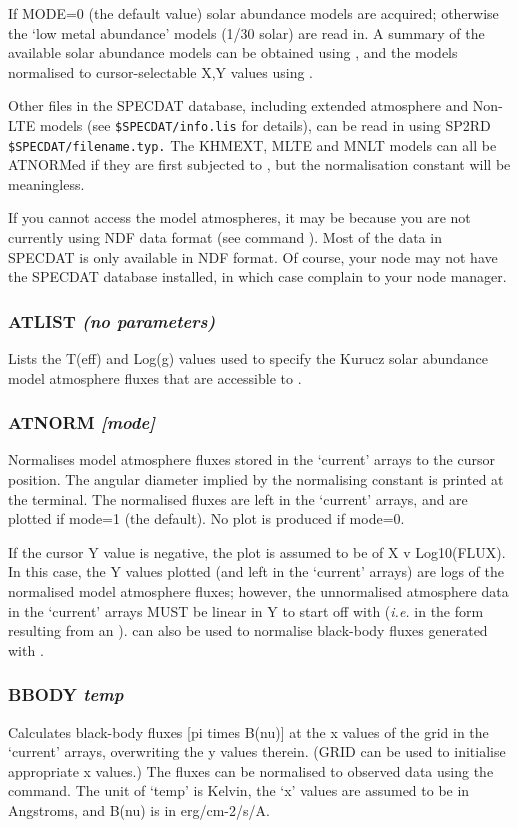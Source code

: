 \documentclass[twoside,11pt,noabs,nolof]{starlink}
\providecommand{\dipcom}[3]{\subsubsection*{\label{COM:#1}\textbf{#1} \emph{#2}}}
\begin{document}
If MODE=0 (the default value) solar abundance models are acquired;
otherwise the `low metal abundance' models (1/30 solar) are read in. A
summary of the available solar abundance models can be obtained using
,  and the models normalised to cursor-selectable X,Y values
using .

Other files in the SPECDAT database, including extended atmosphere and
Non-LTE models (see {\texttt{\$SPECDAT/info.lis}}  for details), can be read in
using SP2RD {\texttt{\$SPECDAT/file\-name.typ.}}  The KHMEXT, MLTE and MNLT
models can all be ATNORMed if they are first subjected to ,  but
the normalisation constant will be meaningless.

If you cannot access the model atmospheres, it may be because you are not
currently using NDF data format (see command ).  Most of the data in
SPECDAT is only available in NDF format. Of course, your node may not have the
SPECDAT database installed, in which case complain to your node manager.

\dipcom{ATLIST}{(no parameters)}{Lists the available Karucz model atmosphere data }
Lists the T(eff) and Log(g) values used to specify the Kurucz solar
abundance model atmosphere fluxes that are accessible to .

\dipcom{ATNORM}{[mode]}{Normalises model atmosphere fluxes}
Normalises model atmosphere fluxes stored in the `current' arrays to
the cursor position. The angular diameter implied by the normalising
constant is printed at the terminal. The normalised fluxes are left in
the `current' arrays, and are plotted if mode=1 (the default). No plot
is produced if mode=0.

If the cursor Y value is negative, the plot is assumed to be of X v
Log10(FLUX). In this case, the Y values plotted (and left in the
`current' arrays) are logs of the normalised model atmosphere fluxes;
however, the unnormalised atmosphere data in the `current' arrays MUST
be linear in Y to start off with (\emph{i.e.} in the form resulting
from an ).    can also be used to normalise black-body
fluxes generated with .

\dipcom{BBODY}{temp}{Calculates black-body fluxes at the current X values}
Calculates black-body fluxes [pi times B(nu)] at the x values of the
grid in the `current' arrays, overwriting the y values therein. (GRID
can be used to initialise appropriate x values.) The fluxes can be
normalised to observed data using the   command. The unit of
`temp' is Kelvin, the `x' values are assumed to be in Angstroms, and
B(nu) is in erg/cm-2/s/A.
\end{document}
